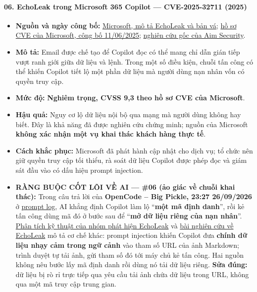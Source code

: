 \paragraph{06. EchoLeak trong Microsoft 365 Copilot --- CVE-2025-32711 (2025)}\label{echoleak-trong-microsoft-365-copilot-cve-2025-32711-2025}

\begin{itemize}
\tightlist
\item
  \textbf{Nguồn và ngày công bố:} \href{https://www.microsoft.com/en-us/security/security-insider/emerging-trends/ai-application-security-considerations-for-organizations}{Microsoft, mô tả EchoLeak và bản vá}; \href{https://msrc.microsoft.com/update-guide/vulnerability/CVE-2025-32711}{hồ sơ CVE của Microsoft, công bố 11/06/2025}; \href{https://www.aim.security/lp/aim-labs-echoleak-m365}{nghiên cứu gốc của Aim Security}.
\item
  \textbf{Mô tả:} Email được chế tạo để Copilot đọc có thể mang chỉ dẫn gián tiếp vượt ranh giới giữa dữ liệu và lệnh. Trong một số điều kiện, chuỗi tấn công có thể khiến Copilot tiết lộ một phần dữ liệu mà người dùng nạn nhân vốn có quyền truy cập.
\item
  \textbf{Mức độ:} \textbf{Nghiêm trọng, CVSS 9,3 theo hồ sơ CVE của Microsoft}.
\item
  \textbf{Hậu quả:} Nguy cơ lộ dữ liệu nội bộ qua mạng mà người dùng không hay biết. Đây là khả năng đã được nghiên cứu chứng minh; nguồn của Microsoft \textbf{không xác nhận một vụ khai thác khách hàng thực tế}.
\item
  \textbf{Cách khắc phục:} Microsoft đã phát hành cập nhật cho dịch vụ; tổ chức nên giữ quyền truy cập tối thiểu, rà soát dữ liệu Copilot được phép đọc và giám sát đầu vào có dấu hiệu prompt injection.
\item
  \textbf{RÀNG BUỘC CỐT LÕI VỀ AI --- \#06 (ảo giác về chuỗi khai thác):} Trong câu trả lời của \textbf{OpenCode -- Big Pickle, 23:27 26/09/2026} ở \href{Appendix_A_Prompt_Log.md}{prompt log}, AI khẳng định Copilot làm lộ ``\textbf{một mã định danh}'', rồi kẻ tấn công dùng mã đó ở bước sau để ``\textbf{mở dữ liệu riêng của nạn nhân}''. \href{https://www.catonetworks.com/blog/breaking-down-echoleak/}{Phân tích kỹ thuật của nhóm phát hiện EchoLeak} và \href{https://arxiv.org/abs/2509.10540}{bài nghiên cứu về EchoLeak} mô tả cơ chế khác: prompt injection khiến Copilot đưa \textbf{chính dữ liệu nhạy cảm trong ngữ cảnh} vào tham số URL của ảnh Markdown; trình duyệt tự tải ảnh, gửi tham số đó tới máy chủ kẻ tấn công. Hai nguồn không nêu bước lấy mã định danh rồi dùng nó tải dữ liệu riêng. \textbf{Sửa đúng:} dữ liệu bị rò rỉ trực tiếp qua yêu cầu tải ảnh chứa dữ liệu trong URL, không qua một mã truy cập trung gian.
\end{itemize}

